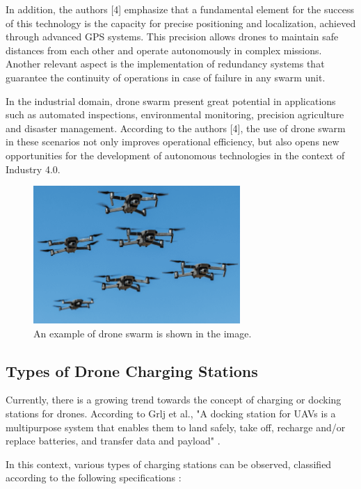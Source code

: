 In addition, the authors [4] emphasize that a fundamental element for the success of this technology is the capacity for precise positioning and localization, achieved through advanced GPS systems. This precision allows drones to maintain safe distances from each other and operate autonomously in complex missions. Another relevant aspect is the implementation of redundancy systems that guarantee the continuity of operations in case of failure in any swarm unit.

In the industrial domain, drone swarm present great potential in applications such as automated inspections, environmental monitoring, precision agriculture and disaster management. According to the authors [4], the use of drone swarm in these scenarios not only improves operational efficiency, but also opens new opportunities for the development of autonomous technologies in the context of Industry 4.0.

\begin{figure}
    \centering
    \includegraphics[width=0.7\textwidth]{pictures/swarms.png}
    \caption{An example of drone swarm is shown in the image. \cite{swarming_drones}}
    \label{fig:swarming_drones_2}
\end{figure}

\subsection{Types of Drone Charging Stations}

    Currently, there is a growing trend towards the concept of charging or docking stations for drones. According to Grlj et al., "A docking station for UAVs is a multipurpose system that enables them to land safely, take off, recharge and/or replace batteries, and transfer data and payload" \cite{grlj_docking_stations}.

    In this context, various types of charging stations can be observed, classified according to the following specifications \cite{grlj_docking_stations}:

